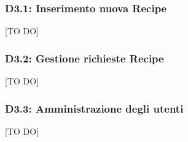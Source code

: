 

		\subsubsection{D3.1: Inserimento nuova Recipe} %
		\label{ssub:inserimento_nuova_recipe}
		[TO DO]


		\subsubsection{D3.2: Gestione richieste Recipe} %
		\label{ssub:gestione_richieste_recipe}
		[TO DO]

		\subsubsection{D3.3: Amministrazione degli utenti} %
		\label{ssub:amministrazione_degli_utenti}
		[TO DO]








